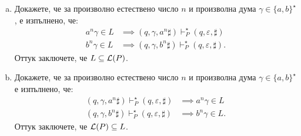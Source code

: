 \begin{extra}
\begin{example}
  \begin{enumerate}[a)]
  \item
    Докажете, че за произволно естествено число $n$ и произволна дума $\gamma \in \{a, b\}^\star$, е изпълнено, че:
    \begin{align}
      a^n\gamma \in L & \implies (q, \gamma, a^n\sharp) \vdash^\star_P (q, \varepsilon, \sharp) \label{eq:omega-ab:1}\\
      b^n\gamma \in L & \implies (q, \gamma, b^n\sharp) \vdash^\star_P (q, \varepsilon, \sharp). \label{eq:omega-ab:2}
    \end{align}
    Оттук заключете, че $L \subseteq \mathcal{L}(P)$.
  \item
    Докажете, че за произволно естествено число $n$ и произволна дума $\gamma \in \{a, b\}^\star$ е изпълнено, че:
    \begin{align}
      (q, \gamma, a^n\sharp) \vdash^\star_P (q, \varepsilon, \sharp) & \implies a^n\gamma \in L \label{eq:omega-ab:3}\\
      (q, \gamma, b^n\sharp) \vdash^\star_P (q, \varepsilon, \sharp) & \implies b^n\gamma \in L. \label{eq:omega-ab:4}
    \end{align}
    Оттук заключете, че $\mathcal{L}(P) \subseteq L$.
  \end{enumerate}
\end{example}


\end{extra}
